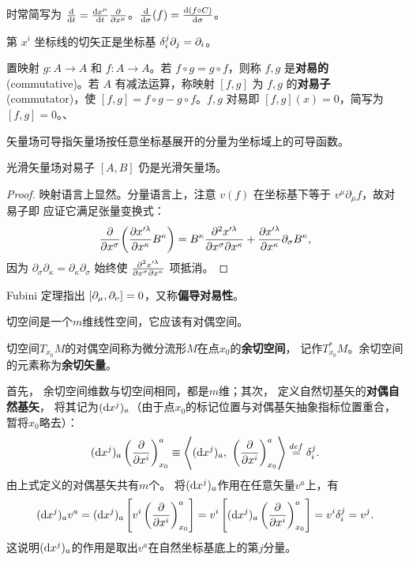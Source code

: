 时常简写为 $\dv{t}=\dv{x^\mu}{t}\pdv{x^\mu}$。$\dv{\sigma} (f)=\dv{(f \circ C)}{\sigma}$。

\begin{example}
    第 $x^i$ 坐标线的切矢正是坐标基 $\delta^j_i\partial_j=\partial_i$。
\end{example}



\begin{definition}
置映射 $g:A\to A$ 和 $f:A\to A$。若 $f\circ g=g\circ f$，则称 $f,g$ 是\textbf{对易的}(commutative)。若 $A$ 有减法运算，称映射 $[f,g]$ 为 $f,g$ 的\textbf{对易子}(commutator)，使 $[f,g]=f\circ g - g \circ f$。$f,g$ 对易即 $[f,g](x)=0$，简写为 $[f,g]=0$。、
\end{definition}


矢量场可导指矢量场按任意坐标基展开的分量为坐标域上的可导函数。

\begin{theorem}
    光滑矢量场对易子 $[A,B]$ 仍是光滑矢量场。
\end{theorem}
\begin{proof}
    映射语言上显然。分量语言上，注意 $v(f)$ 在坐标基下等于 $v^\mu\partial_\mu f$，故对易子即
    应证它满足张量变换式：
    \[
        \pdv{x^\sigma}(\pdv{x'^\lambda}{x^\kappa}B^\kappa)=  B^\kappa\pdv{x'^\lambda}{x^\sigma}{x^\kappa}+\pdv{x'^\lambda}{x^\kappa}\partial_\sigma B^\kappa,
    \]
    因为 $\partial_\sigma\partial_\kappa=\partial_\kappa\partial_\sigma$ 始终使 $\pdv{x'^\lambda}{x^\sigma}{x^\kappa}$ 项抵消。
\end{proof}

\begin{example}
    Fubini 定理指出 $\left[\partial_\mu,\partial_\nu\right]=0$，又称\textbf{偏导对易性}。
\end{example}


切空间是一个$m$维线性空间，它应该有对偶空间。
\begin{definition}
    切空间$T_{x_0}M$的对偶空间称为微分流形$M$在点$x_0$的\textbf{余切空间}，
    记作$T_{x_0}^{*}M$。余切空间的元素称为\textbf{余切矢量}。
\end{definition}
首先，
余切空间维数与切空间相同，都是$m$维；其次，
定义自然切基矢的\textbf{对偶自然基矢}，
将其记为$({\rm d}x^j)_a$（由于点${x_0}$的标记位置与对偶基矢抽象指标位置重合，暂将${x_0}$略去）：
\begin{equation}\label{chdm:eqn_dual-natural-bases}
    ({\rm d}x^j)_a \left(\frac{\partial }{\partial x^i}\right)^a_{x_0} \equiv 
    \left< ({\rm d}x^j)_a , \   \left(\frac{\partial }{\partial x^i}\right)^a_{x_0}\right>
    \overset{def}{=} \delta^j_i .
\end{equation}
由上式定义的对偶基矢共有$m$个。
将$({\rm d}x^j)_a$作用在任意矢量$v^a$上，有
\begin{equation*}
    ({\rm d}x^j)_a v^a =  ({\rm d}x^j)_a 
       \left[v^i \left(\frac{\partial }{\partial x^i}\right)^a_{x_0}\right] 
    =  v^i \left[ ({\rm d}x^j)_a  \left(\frac{\partial }{\partial x^i}\right)^a_{x_0}\right] 
    =  v^i \delta^j_i = v^j .
\end{equation*}
这说明$({\rm d}x^j)_a$的作用是取出$v^a$在自然坐标基底上的第$j$分量。

